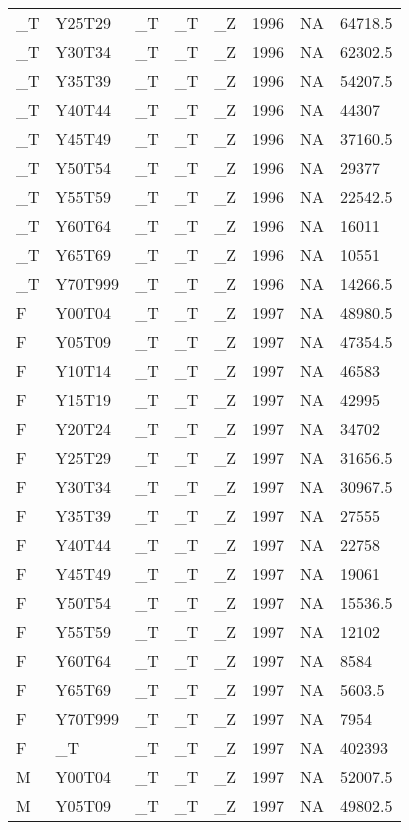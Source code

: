 \begin{longtable}[t]{llllllll}
\_T & Y25T29 & \_T & \_T & \_Z & 1996 & NA & 64718.5\\
\addlinespace
\_T & Y30T34 & \_T & \_T & \_Z & 1996 & NA & 62302.5\\
\_T & Y35T39 & \_T & \_T & \_Z & 1996 & NA & 54207.5\\
\_T & Y40T44 & \_T & \_T & \_Z & 1996 & NA & 44307\\
\_T & Y45T49 & \_T & \_T & \_Z & 1996 & NA & 37160.5\\
\_T & Y50T54 & \_T & \_T & \_Z & 1996 & NA & 29377\\
\addlinespace
\_T & Y55T59 & \_T & \_T & \_Z & 1996 & NA & 22542.5\\
\_T & Y60T64 & \_T & \_T & \_Z & 1996 & NA & 16011\\
\_T & Y65T69 & \_T & \_T & \_Z & 1996 & NA & 10551\\
\_T & Y70T999 & \_T & \_T & \_Z & 1996 & NA & 14266.5\\
F & Y00T04 & \_T & \_T & \_Z & 1997 & NA & 48980.5\\
\addlinespace
F & Y05T09 & \_T & \_T & \_Z & 1997 & NA & 47354.5\\
F & Y10T14 & \_T & \_T & \_Z & 1997 & NA & 46583\\
F & Y15T19 & \_T & \_T & \_Z & 1997 & NA & 42995\\
F & Y20T24 & \_T & \_T & \_Z & 1997 & NA & 34702\\
F & Y25T29 & \_T & \_T & \_Z & 1997 & NA & 31656.5\\
\addlinespace
F & Y30T34 & \_T & \_T & \_Z & 1997 & NA & 30967.5\\
F & Y35T39 & \_T & \_T & \_Z & 1997 & NA & 27555\\
F & Y40T44 & \_T & \_T & \_Z & 1997 & NA & 22758\\
F & Y45T49 & \_T & \_T & \_Z & 1997 & NA & 19061\\
F & Y50T54 & \_T & \_T & \_Z & 1997 & NA & 15536.5\\
\addlinespace
F & Y55T59 & \_T & \_T & \_Z & 1997 & NA & 12102\\
F & Y60T64 & \_T & \_T & \_Z & 1997 & NA & 8584\\
F & Y65T69 & \_T & \_T & \_Z & 1997 & NA & 5603.5\\
F & Y70T999 & \_T & \_T & \_Z & 1997 & NA & 7954\\
F & \_T & \_T & \_T & \_Z & 1997 & NA & 402393\\
\addlinespace
M & Y00T04 & \_T & \_T & \_Z & 1997 & NA & 52007.5\\
M & Y05T09 & \_T & \_T & \_Z & 1997 & NA & 49802.5\\

\end{longtable}
